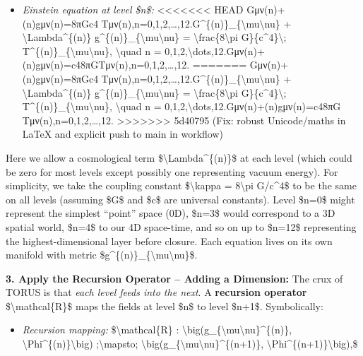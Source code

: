\documentclass[]{article}
\begin{document}
\begin{itemize}
\item
  \emph{Einstein equation at level \$n\$:}
<<<<<<< HEAD
  Gμν(n)+\Lambda(n)gμν(n)=8πGc4  Tμν(n),n=0,1,2,\ldots,12.G\^{}\{(n)\}\_\{\textbackslash mu\textbackslash nu\}
  + \textbackslash Lambda\^{}\{(n)\}
  g\^{}\{(n)\}\_\{\textbackslash mu\textbackslash nu\} =
  \textbackslash frac\{8\textbackslash pi G\}\{c\^{}4\}\textbackslash;
  T\^{}\{(n)\}\_\{\textbackslash mu\textbackslash nu\},
  \textbackslash quad n =
  0,1,2,\textbackslash dots,12.Gμν(n)\hspace{0pt}+\Lambda(n)gμν(n)\hspace{0pt}=c48πG\hspace{0pt}Tμν(n)\hspace{0pt},n=0,1,2,\ldots,12.
=======
  Gμν(n)+\Lambda(n)gμν(n)=8πGc4  Tμν(n),n=0,1,2,\ldots{},12.G\^{}\{(n)\}\_\{\textbackslash{}mu\textbackslash{}nu\}
  + \textbackslash{}Lambda\^{}\{(n)\}
  g\^{}\{(n)\}\_\{\textbackslash{}mu\textbackslash{}nu\} =
  \textbackslash{}frac\{8\textbackslash{}pi
  G\}\{c\^{}4\}\textbackslash{};
  T\^{}\{(n)\}\_\{\textbackslash{}mu\textbackslash{}nu\},
  \textbackslash{}quad n =
  0,1,2,\textbackslash{}dots,12.Gμν(n)​+\Lambda(n)gμν(n)​=c48πG​Tμν(n)​,n=0,1,2,\ldots{},12.
>>>>>>> 5d40795 (Fix: robust Unicode/maths in LaTeX and explicit push to main in workflow)
\end{itemize}

Here we allow a cosmological term \$\textbackslash{}Lambda\^{}\{(n)\}\$
at each level (which could be zero for most levels except possibly one
representing vacuum energy). For simplicity, we take the coupling
constant \$\textbackslash{}kappa = 8\textbackslash{}pi G/c\^{}4\$ to be
the same on all levels (assuming \$G\$ and \$c\$ are universal
constants)​. Level \$n=0\$ might represent the simplest ``point'' space
(0D), \$n=3\$ would correspond to a 3D spatial world, \$n=4\$ to our 4D
space-time, and so on up to \$n=12\$ representing the
highest-dimensional layer before closure. Each equation lives on its own
manifold with metric
\$g\^{}\{(n)\}\_\{\textbackslash{}mu\textbackslash{}nu\}\$.

\textbf{3. Apply the Recursion Operator -- Adding a Dimension:} The crux
of TORUS is that \emph{each level feeds into the next}. A
\textbf{recursion operator} \$\textbackslash{}mathcal\{R\}\$ maps the
fields at level \$n\$ to level \$n+1\$. Symbolically​:

\begin{itemize}
\item
  \emph{Recursion mapping:} \$\textbackslash{}mathcal\{R\} :
  \textbackslash{}big(g\_\{\textbackslash{}mu\textbackslash{}nu\}\^{}\{(n)\},
  \textbackslash{}Phi\^{}\{(n)\}\textbackslash{}big)
  ;\textbackslash{}mapsto;
  \textbackslash{}big(g\_\{\textbackslash{}mu\textbackslash{}nu\}\^{}\{(n+1)\},
  \textbackslash{}Phi\^{}\{(n+1)\}\textbackslash{}big),\$
\end{itemize}
\end{document}
